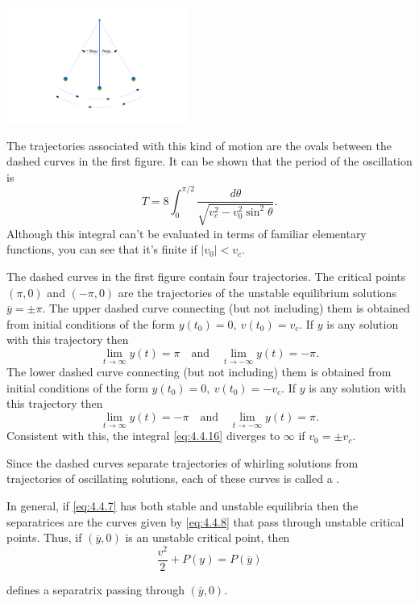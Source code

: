 \documentclass{ximera}
\begin{document}
\begin{example}
\begin{image}
 \includegraphics[height=1.5in]{fig040409.jpg} 
\end{image}


The
trajectories associated with this kind of motion are the ovals between
the dashed curves in the first figure. It can be shown %
that the period of the
oscillation is
\begin{equation} \label{eq:4.4.16}
T=8\int_0^{\pi/2}\frac{d\theta}{\sqrt{v_c^2-v_0^2\sin^2\theta}}.
\end{equation}
Although this integral can't be evaluated in terms of familiar
elementary functions, you can see that it's finite if $|v_0|<v_c$.

The dashed curves in the first figure contain four
trajectories. The critical points $(\pi,0)$ and $(-\pi,0)$ are the
trajectories of the unstable equilibrium solutions $\overline
y=\pm\pi$.
The upper dashed curve connecting (but not including) them is obtained
from initial conditions of the form $y(t_0)=0,\ v(t_0)=v_c$. If $y$ is
any solution with this trajectory then
$$
\lim_{t\rightarrow\infty}y(t)=\pi\quad\mbox{and}\quad\lim_{t\rightarrow-\infty}y(t)=-\pi.
$$
The lower dashed curve connecting (but not including) them is obtained
from initial conditions of the form $y(t_0)=0,\ v(t_0)=-v_c$. If $y$
is any solution with this trajectory then
$$
\lim_{t\rightarrow\infty}y(t)=-\pi\quad\mbox{and}\quad\lim_{t\rightarrow-\infty}y(t)=\pi.
$$
Consistent with this, the integral \eqref{eq:4.4.16} diverges to $\infty$
if $v_0=\pm v_c$. %

Since the dashed curves separate trajectories of whirling solutions
from trajectories of oscillating solutions, each of these curves is
called a .

In general, if \eqref{eq:4.4.7} has both stable and unstable equilibria
then the separatrices are the curves given by \eqref{eq:4.4.8} that pass
through unstable critical points. Thus, if $(\overline{y},0)$ is an
unstable critical point, then
\begin{equation} \label{eq:4.4.17}
\frac{v^2}{2}+P(y)=P(\overline{y})
\end{equation}

defines a separatrix passing through $(\overline{y},0)$.
\end{example}
\end{document}
